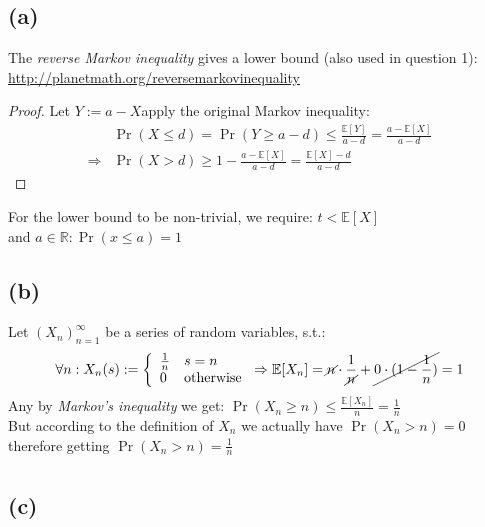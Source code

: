\documentclass[a4paper]{article}
\newcommand{\lc}{\left\{}
\newcommand{\E}{\mathbb{E}}
\newcommand{\qedsquare}{\tag*{$\square$}}
\begin{document}
\subsection {(a)}

The \textit{reverse Markov inequality} gives a lower bound (also used in question 1): \\
\url{http://planetmath.org/reversemarkovinequality}
\markov*
\begin{proof}
    Let $Y:=a-X$apply the original Markov inequality:
    \begin{align*}
        &\Pr(X\leq d) = \Pr(Y\geq a-d) 
        \leq \frac{\E[Y]}{a-d} 
        = \frac{a-\E[X]}{a-d} \\
        \Rightarrow &\Pr(X>d) \geq 1 - \frac{a-\E[X]}{a-d} = \frac{\E[X]-d}{a-d}
    \end{align*}
\end{proof}

For the lower bound to be non-trivial, we require: $t<\E[X]$ \\
and $ a\in\mathbb{R} : \Pr(x \leq a) = 1 $

\subsection {(b)}

Let $(X_n)_{n=1}^{\infty}$ be a series of random variables, s.t.:\\
\begin{align*}
    \forall n: X_n (s) := \lc
    \begin{array}{ll}
        \frac{1}{n} & \mbox{$s=n$} \\
        0 & \mbox{otherwise}
    \end{array} \right.
    \Rightarrow \E[X_n] = \cancel{n} \cdot \frac{1}{\cancel{n}} + \cancel{0 \cdot (1 - \frac{1}{n})} = 1 \\
\end{align*}
Any by \textit{Markov's inequality} we get: $ \Pr(X_n \geq n) \leq \displaystyle \frac{\E[X_n]}{n} = \frac{1}{n} $ \\
But according to the definition of $X_n$ we actually have $\Pr(X_n>n)=0$ therefore getting $\Pr(X_n>n)=\frac{1}{n}$ \\
\begin{align*}\qedsquare\end{align*}

\subsection {(c)}
\end{document}
